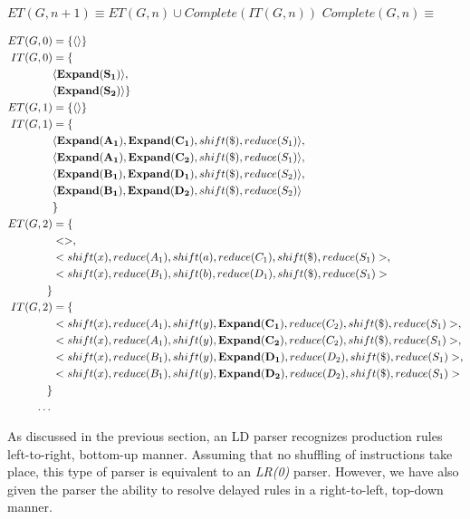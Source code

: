 \documentclass[a4paper,11pt]{article}
\begin{document}
$ET(G, n+1) \equiv ET(G, n) \cup Complete(IT(G, n))$
$Complete(G, n) \equiv $

{\small\begin{align*}
ET(G, 0) & = \{ \langle \rangle \}\\
IT(G, 0) & = \{\\
\quad & \langle \mathbf{Expand(S_1)} \rangle,\\
\quad & \langle \mathbf{Expand(S_2)} \rangle \}\\
ET(G, 1) & = \{ \langle \rangle \}\\
IT(G, 1) & = \{ \\
\quad & \langle \mathbf{Expand(A_1)}, \mathbf{Expand(C_1)}, shift(\$), reduce(S_1) \rangle,\\
\quad & \langle \mathbf{Expand(A_1)}, \mathbf{Expand(C_2)}, shift(\$), reduce(S_1) \rangle,\\
\quad & \langle \mathbf{Expand(B_1)}, \mathbf{Expand(D_1)}, shift(\$), reduce(S_2) \rangle, \\
\quad & \langle \mathbf{Expand(B_1)}, \mathbf{Expand(D_2)}, shift(\$), reduce(S_2) \rangle \\
\quad & \}\\
ET(G, 2) & = \{\\
\quad & <>, \\
\quad & <shift(x), reduce(A_1), shift(a), reduce(C_1), shift(\$), reduce(S_1)>,\\
\quad & <shift(x), reduce(B_1), shift(b), reduce(D_1), shift(\$), reduce(S_1)>\\
\}\\
IT(G, 2) & = \{ \\
\quad & <shift(x), reduce(A_1), shift(y), \mathbf{Expand(C_1)}, reduce(C_2), shift(\$), reduce(S_1)>,\\
\quad & <shift(x), reduce(A_1), shift(y), \mathbf{Expand(C_2)}, reduce(C_2), shift(\$), reduce(S_1)>,\\
\quad & <shift(x), reduce(B_1), shift(y), \mathbf{Expand(D_1)}, reduce(D_2), shift(\$), reduce(S_1)>,\\
\quad & <shift(x), reduce(B_1), shift(y), \mathbf{Expand(D_2)}, reduce(D_2), shift(\$), reduce(S_1)>\\
 \}\\
 \textellipsis
\end{align*}}

As discussed in the previous section, an LD parser recognizes production rules left-to-right, bottom-up manner. 
Assuming that no shuffling of instructions take place, this type of parser is equivalent to an \emph{LR(0)} parser.
However, we have also given the parser the ability to resolve delayed rules in a right-to-left, top-down manner.
\end{document}
